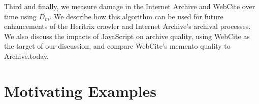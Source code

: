 Third and finally, we measure damage in the Internet Archive and WebCite over time using $D_m$. We describe how this algorithm can be used for future enhancements of the Heritrix crawler \cite{Sigurosson:Incremental-Heritrix, heritrix} and Internet Archive's archival processes. We also discuss the impacts of JavaScript on archive quality, using WebCite as the target of our discussion, and compare WebCite's memento quality to Archive.today.



\section{Motivating Examples}
\label{example}


